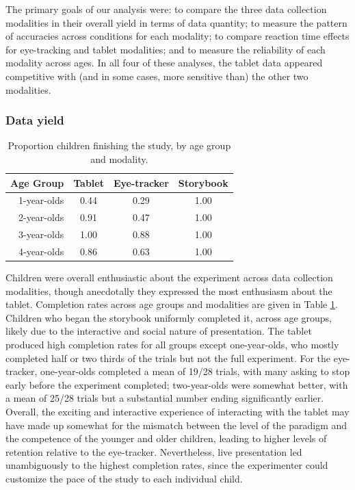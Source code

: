 \documentclass[man,noapacite]{apa2}
\begin{document}
The primary goals of our analysis were: to compare the three data collection modalities in their overall yield in terms of data quantity; to measure the pattern of accuracies across conditions for each modality; to compare reaction time effects for eye-tracking and tablet modalities; and to measure the reliability of each modality across ages. In all four of these analyses, the tablet data appeared competitive with (and in some cases, more sensitive than) the other two modalities. 

\subsubsection{Data yield} 

\begin{table}[t]
\centering
\caption{Proportion children finishing the study, by age group and modality.\label{tab:completion}}

\begin{tabular}{rccc}
  \hline
Age Group & Tablet & Eye-tracker & Storybook \\ 
  \hline
1-year-olds & 0.44 & 0.29& 1.00 \\ 
2-year-olds & 0.91 & 0.47 & 1.00\\ 
3-year-olds & 1.00 & 0.88 & 1.00\\ 
4-year-olds & 0.86 & 0.63 & 1.00\\ 
   \hline
\end{tabular}
\end{table}

Children were overall enthusiastic about the experiment across data collection modalities, though anecdotally they expressed the most enthusiasm about the tablet. Completion rates across age groups and modalities are given in Table \ref{tab:completion}. Children who began the storybook uniformly completed it, across age groups, likely due to the interactive and social nature of presentation. The tablet produced high completion rates for all groups except one-year-olds, who mostly completed half or two thirds of the trials but not the full experiment. For the eye-tracker, one-year-olds completed a mean of 19/28 trials, with many asking to stop early before the experiment completed; two-year-olds were somewhat better, with a mean of 25/28 trials but a substantial number ending significantly earlier. Overall, the exciting and interactive experience of interacting with the tablet may have made up somewhat for the mismatch between the level of the paradigm and the competence of the younger and older children, leading to higher levels of retention relative to the eye-tracker. Nevertheless, live presentation led unambiguously to the highest completion rates, since the experimenter could customize the pace of the study to each individual child.
\end{document}
